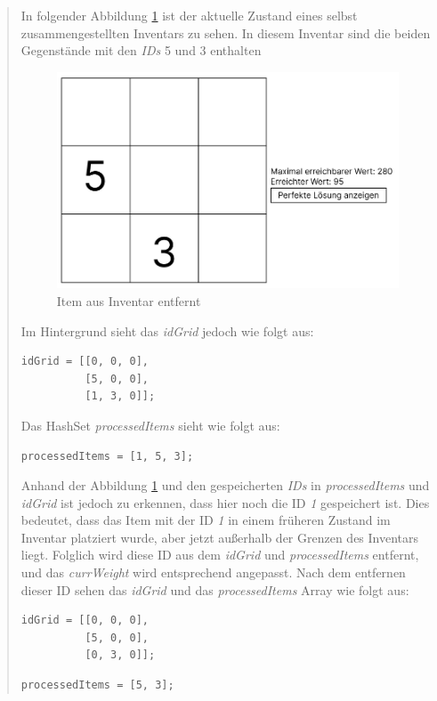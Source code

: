 \begin{quote}
In folgender Abbildung \ref{fig:controller_itemEntfernt} ist der aktuelle Zustand eines selbst zusammengestellten Inventars
zu sehen. In diesem Inventar sind die beiden Gegenstände mit den \textit{IDs} 5 und 3 enthalten

\begin{figure}[h]
\centering
\includegraphics[scale=0.6]{images/itemEntfernt}
\caption{Item aus Inventar entfernt}
\label{fig:controller_itemEntfernt}
\end{figure}
Im Hintergrund sieht das \textit{idGrid} jedoch wie folgt aus:

\begin{lstlisting}[style=csharp label=code:controller_savedIDitemEntferntGrid]
idGrid = [[0, 0, 0],
          [5, 0, 0],
          [1, 3, 0]];
\end{lstlisting}

Das HashSet \textit{processedItems} sieht wie folgt aus:

\begin{lstlisting}[style=csharp label=code:controller_savedIDItemEntferntHash]
processedItems = [1, 5, 3];
\end{lstlisting}

Anhand der Abbildung \ref{fig:controller_itemEntfernt} und den gespeicherten \textit{IDs} in \textit{processedItems} und
\textit{idGrid} ist jedoch zu erkennen, dass hier noch die ID \textit{1} gespeichert ist. Dies bedeutet, dass das Item
mit der ID \textit{1} in einem früheren Zustand im Inventar platziert wurde, aber jetzt außerhalb der Grenzen des Inventars
liegt. Folglich wird diese ID aus dem \textit{idGrid} und \textit{processedItems} entfernt, und das \textit{currWeight}
wird entsprechend angepasst. Nach dem entfernen dieser ID sehen das \textit{idGrid} und das \textit{processedItems} Array
wie folgt aus:

\begin{lstlisting}[style=csharp label=code:controller_savedIDgg]
idGrid = [[0, 0, 0],
          [5, 0, 0],
          [0, 3, 0]];
\end{lstlisting}
\begin{lstlisting}[style=csharp label=code:controller_savedIDID]
processedItems = [5, 3];
\end{lstlisting}
\end{quote}


